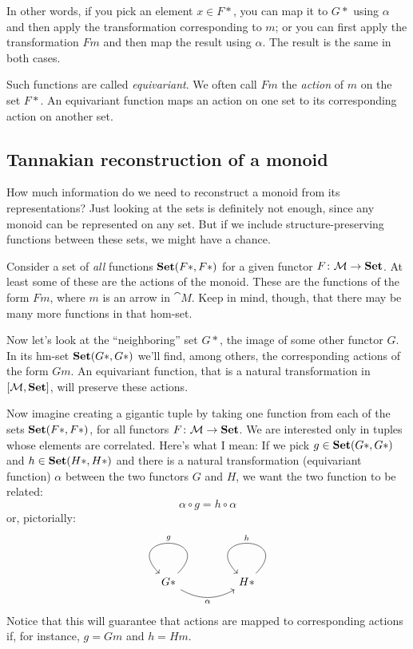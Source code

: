 \documentclass[DaoFP]{subfiles}
\begin{document}
In other words, if you pick an element $x \in F *$, you can map it to $G *$ using $\alpha$ and then apply the transformation corresponding to $m$; or you can first apply the transformation $F m$ and then map the result using $\alpha$. The result is the same in both cases.

Such functions are called \emph{equivariant}. We often call $F m$ the \emph{action} of $m$ on the set $F *$. An equivariant function maps an action on one set to its corresponding action on another set. 

\subsection{Tannakian reconstruction of a monoid}

How much information do we need to reconstruct a monoid from its representations? Just looking at the sets is definitely not enough, since any monoid can be represented on any set. But if we include structure-preserving functions between these sets, we might have a chance. 

Consider a set of \emph{all} functions $\mathbf{Set}(F *, F *)$ for a given functor $F \colon \mathcal{M} \to \mathbf{Set}$. At least some of these are the actions of the monoid. These are the functions of the form $F m$, where $m$ is an arrow in $\cat M$. Keep in mind, though, that there may be many more functions in that hom-set.

Now let's look at the ``neighboring'' set $G *$, the image of some other functor $G$. In its hm-set  $\mathbf{Set}(G *, G *)$ we'll find, among others, the corresponding actions of the form $G m$. An equivariant function, that is a natural transformation in $[\mathcal{M}, \mathbf{Set}]$, will preserve these actions.

Now imagine creating a gigantic tuple by taking one function from each of the sets $\mathbf{Set} (F *, F *)$, for all functors $F\colon \mathcal{M} \to \mathbf{Set}$. We are interested only in tuples whose elements are correlated. Here's what I mean: If we pick $g \in  \mathbf{Set} (G*, G *)$ and  $h \in  \mathbf{Set} (H*,  H*)$ and there is a natural transformation (equivariant function) $\alpha$ between the two functors $G$ and $H$, we want the two function to be related:
\[ \alpha \circ g = h \circ \alpha \]
or, pictorially:
\[
 \begin{tikzcd}
 G *
  \arrow[loop, "g"']
  \arrow[rr, bend right, "\alpha"']
 && H *
  \arrow[loop, "h"']
  \end{tikzcd}
\]
Notice that this will guarantee that actions are mapped to corresponding actions if, for instance, $g = G m$ and $h = H m$. 
\end{document}
